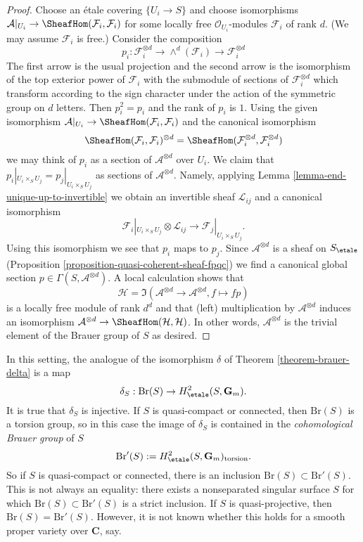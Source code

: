 \begin{proof}
Choose an \'etale covering $\{U_i \to S\}$ and choose isomorphisms
$\mathcal{A}|_{U_i} \to \SheafHom(\mathcal{F}_i, \mathcal{F}_i)$
for some locally free $\mathcal{O}_{U_i}$-modules $\mathcal{F}_i$
of rank $d$. (We may assume $\mathcal{F}_i$ is free.) Consider the
composition
$$
p_i : \mathcal{F}_i^{\otimes d} \to
\wedge^d(\mathcal{F}_i) \to \mathcal{F}_i^{\otimes d}
$$
The first arrow is the usual projection and the second arrow is
the isomorphism of the top exterior power of $\mathcal{F}_i$ with
the submodule of sections of $\mathcal{F}_i^{\otimes d}$ which transform
according to the sign character under the action of the symmetric group
on $d$ letters. Then $p_i^2 = p_i$ and the rank of $p_i$ is $1$.
Using the given isomorphism
$\mathcal{A}|_{U_i} \to \SheafHom(\mathcal{F}_i, \mathcal{F}_i)$
and the canonical isomorphism
$$
\SheafHom(\mathcal{F}_i, \mathcal{F}_i)^{\otimes d} =
\SheafHom(\mathcal{F}_i^{\otimes d}, \mathcal{F}_i^{\otimes d})
$$
we may think of $p_i$ as a section of $\mathcal{A}^{\otimes d}$
over $U_i$. We claim that $p_i|_{U_i \times_S U_j} = p_j|_{U_i \times_S U_j}$
as sections of $\mathcal{A}^{\otimes d}$. Namely, applying
Lemma \ref{lemma-end-unique-up-to-invertible}
we obtain an invertible sheaf $\mathcal{L}_{ij}$ and a canonical isomorphism
$$
\mathcal{F}_i|_{U_i \times_S U_j} \otimes \mathcal{L}_{ij}
\longrightarrow
\mathcal{F}_j|_{U_i \times_S U_j}.
$$
Using this isomorphism we see that $p_i$ maps to $p_j$.
Since $\mathcal{A}^{\otimes d}$ is a sheaf on $S_\etale$
(Proposition \ref{proposition-quasi-coherent-sheaf-fpqc}) we find a canonical
global section $p \in \Gamma(S, \mathcal{A}^{\otimes d})$. A local calculation
shows that
$$
\mathcal{H} =
\Im(\mathcal{A}^{\otimes d} \to \mathcal{A}^{\otimes d}, f \mapsto fp)
$$
is a locally free module of rank $d^d$ and that (left) multiplication
by $\mathcal{A}^{\otimes d}$ induces an isomorphism
$\mathcal{A}^{\otimes d} \to \SheafHom(\mathcal{H}, \mathcal{H})$.
In other words, $\mathcal{A}^{\otimes d}$ is the trivial element
of the Brauer group of $S$ as desired.
\end{proof}

\noindent
In this setting, the analogue of the isomorphism $\delta$ of
Theorem \ref{theorem-brauer-delta}
is a map
$$
\delta_S: \text{Br}(S) \to H_\etale^2(S, \mathbf{G}_m).
$$
It is true that $\delta_S$ is injective. If $S$ is quasi-compact or
connected, then $\text{Br}(S)$ is a torsion group, so in this case the
image of $\delta_S$ is contained in the {\it cohomological Brauer group} of $S$
$$
\text{Br}'(S) := H_\etale^2(S, \mathbf{G}_m)_\text{torsion}.
$$
So if $S$ is quasi-compact or connected, there is an inclusion $\text{Br}(S)
\subset \text{Br}'(S)$. This is not always an equality: there exists a
nonseparated singular surface $S$ for which $\text{Br}(S) \subset
\text{Br}'(S)$ is a strict inclusion. If $S$ is quasi-projective, then
$\text{Br}(S) = \text{Br}'(S)$. However, it is not known whether this holds for
a smooth proper variety over $\mathbf{C}$, say.




